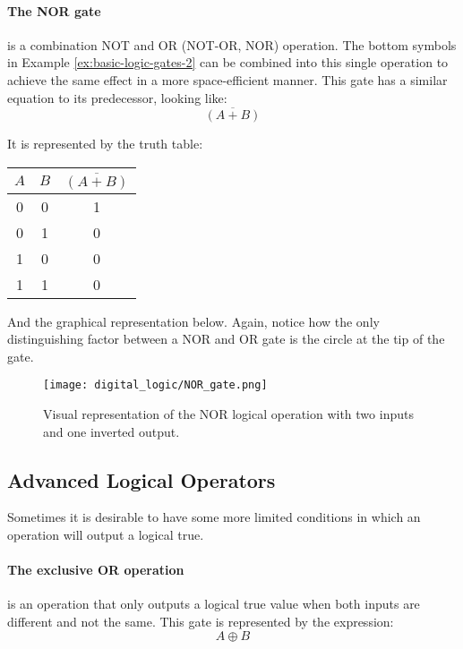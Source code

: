     \paragraph*{The NOR gate} is a combination NOT and OR (NOT-OR, NOR) operation.
    The bottom symbols in Example \ref{ex:basic-logic-gates-2} can be combined into this single operation to achieve the same effect in a more space-efficient manner.
    This gate has a similar equation to its predecessor, looking like:
    \begin{equation*}
        \overline{(A + B)}
    \end{equation*}

    It is represented by the truth table:
    \begin{table}[h!]
        \begin{tabular}{c c | c}
            \toprule
            $A$ & $B$ & $\overline{(A + B)}$  \\
            \midrule
             0  &  0  &    1    \\
             0  &  1  &    0    \\
             1  &  0  &    0    \\
             1  &  1  &    0    \\
            \bottomrule
        \end{tabular}
    \end{table}

    And the graphical representation below. 
    Again, notice how the only distinguishing factor between a NOR and OR gate is the circle at the tip of the gate.
    \begin{figure}[h!]
        \texttt{[image: digital\_logic/NOR\_gate.png]}
        \caption[NOR Gate]{Visual representation of the NOR logical operation with two inputs and one inverted output.}
    \end{figure}

    \subsection{Advanced Logical Operators}
    Sometimes it is desirable to have some more limited conditions in which an operation will output a logical true.
    
    \paragraph*{The exclusive OR operation} is an operation that only outputs a logical true value when both inputs are different and not the same.
    This gate is represented by the expression:
    \begin{equation*}
        A \oplus B
    \end{equation*}

